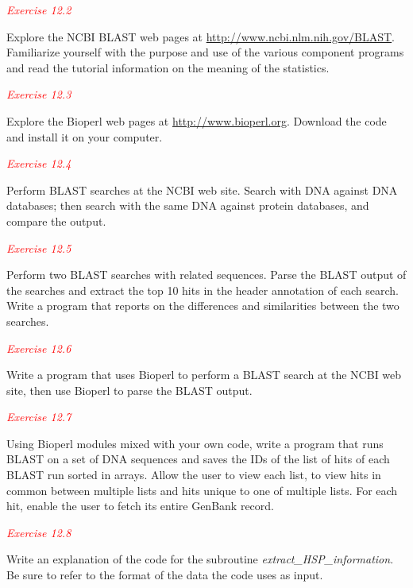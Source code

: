 \textcolor{red}{\textit{Exercise 12.2}}
\begin{adjustwidth}{1cm}{}
Explore the NCBI BLAST web pages at \href{http://www.ncbi.nlm.nih.gov/BLAST}{http://www.ncbi.nlm.nih.gov/BLAST}. Familiarize yourself with the purpose and use of the various component programs and read the tutorial information on the meaning of the statistics. 
\end{adjustwidth}

\textcolor{red}{\textit{Exercise 12.3}}
\begin{adjustwidth}{1cm}{}
Explore the Bioperl web pages at \href{http://www.bioperl.org}{http://www.bioperl.org}. Download the code and install it on your computer. 
\end{adjustwidth}

\textcolor{red}{\textit{Exercise 12.4}}
\begin{adjustwidth}{1cm}{}
Perform BLAST searches at the NCBI web site. Search with DNA against DNA databases; then search with the same DNA against protein databases, and compare the output.
\end{adjustwidth}

\textcolor{red}{\textit{Exercise 12.5}}
\begin{adjustwidth}{1cm}{}
Perform two BLAST searches with related sequences. Parse the BLAST output of the searches and extract the top 10 hits in the header annotation of each search. Write a program that reports on the differences and similarities between the two searches.
\end{adjustwidth}

\textcolor{red}{\textit{Exercise 12.6}}
\begin{adjustwidth}{1cm}{}
Write a program that uses Bioperl to perform a BLAST search at the NCBI web site, then use Bioperl to parse the BLAST output. 
\end{adjustwidth}

\textcolor{red}{\textit{Exercise 12.7}}
\begin{adjustwidth}{1cm}{}
Using Bioperl modules mixed with your own code, write a program that runs BLAST on a set of DNA sequences and saves the IDs of the list of hits of each BLAST run sorted in arrays. Allow the user to view each list, to view hits in common between multiple lists and hits unique to one of multiple lists. For each hit, enable the user to fetch its entire GenBank record. 
\end{adjustwidth}

\textcolor{red}{\textit{Exercise 12.8}}
\begin{adjustwidth}{1cm}{}
Write an explanation of the code for the subroutine \textit{extract\_HSP\_information}. Be sure to refer to the format of the data the code uses as input. 
\end{adjustwidth}

